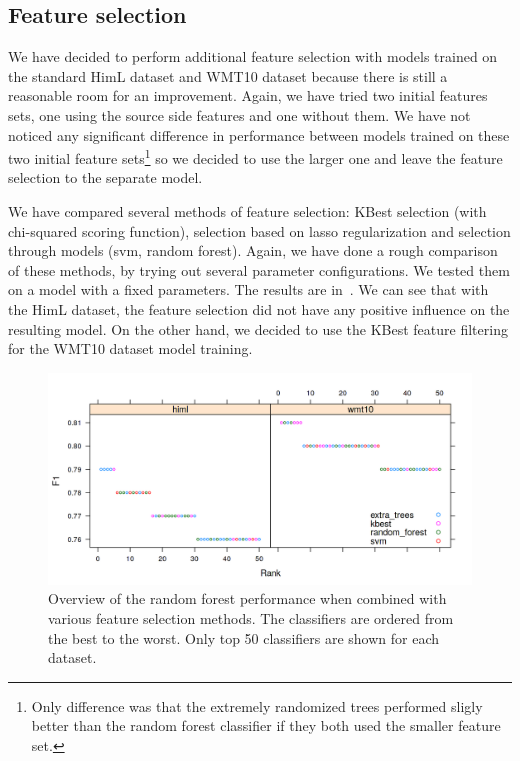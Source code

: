 \subsection{Feature selection}

We have decided to perform additional feature selection with models trained on the standard HimL dataset
and WMT10 dataset because there is still a reasonable room for an improvement. Again, we have tried two initial features
sets, one using the source side features and one without them. We have not noticed any significant difference in performance
between models trained on these two initial feature sets\footnote{Only difference was that the extremely randomized
trees performed sligly better than the random forest classifier if they both used the smaller feature set.} so we decided to use the larger one and leave
the feature selection to the separate model.

We have compared several methods of feature selection: KBest selection
(with chi-squared scoring function), selection based on lasso regularization and selection through
models (svm, random forest). Again, we have done a rough comparison of these methods, by trying out
several parameter configurations. We tested them on a model with a fixed parameters. The results
are in~. We can see that with the HimL dataset, the feature selection did not have
any positive influence on the resulting model. On the other hand, we decided to use the KBest
feature filtering for the WMT10 dataset model training.

\begin{figure}
\centering
  \includegraphics[scale=0.7]{cat-sel}
  \caption{
    Overview of the random forest performance when combined with various feature selection methods.
The classifiers are ordered from the best to the worst. Only top 50 classifiers
are shown for each dataset.
}
  \label{cat-sel}
\end{figure}

